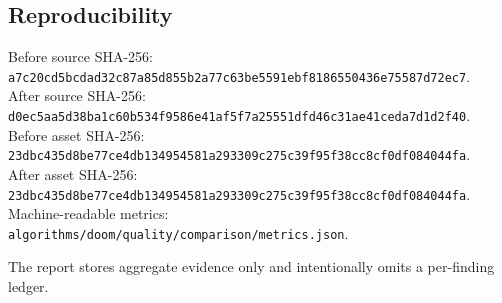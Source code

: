 \documentclass[11pt]{article}
\begin{document}
\subsection*{Reproducibility}
Before source SHA-256:
\texttt{a7c20cd5bcdad32c87a85d855b2a77c63be5591ebf8186550436e75587d72ec7}.\\
After source SHA-256:
\texttt{d0ec5aa5d38ba1c60b534f9586e41af5f7a25551dfd46c31ae41ceda7d1d2f40}.\\
Before asset SHA-256:
\texttt{23dbc435d8be77ce4db134954581a293309c275c39f95f38cc8cf0df084044fa}.\\
After asset SHA-256:
\texttt{23dbc435d8be77ce4db134954581a293309c275c39f95f38cc8cf0df084044fa}.\\
Machine-readable metrics:
\texttt{algorithms/doom/quality/comparison/metrics.json}.

The report stores aggregate evidence only and intentionally omits a
per-finding ledger.
\end{document}
